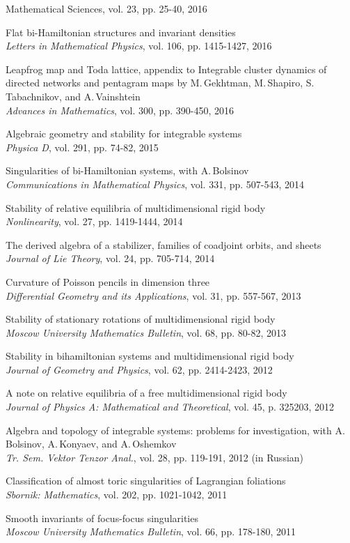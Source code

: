 \documentclass[a4paper, 12pt]{article}
\begin{document}
\begin{compactenum}
{Mathematical Sciences}, vol. 23, pp. 25-40, 2016
\item {{Flat bi-Hamiltonian structures and invariant densities}}\\\textit{Letters in Mathematical Physics},  vol. 106, pp. 1415-1427, 2016
\item {{Leapfrog map and Toda lattice}}, appendix to {{Integrable cluster dynamics of directed networks and pentagram maps}} by M.\,Gekhtman, M.\,Shapiro, S.\,Tabachnikov,  and A.\,Vainshtein\\\textit{Advances in Mathematics}, vol. 300, pp. 390-450, 2016
\item {{Algebraic geometry and stability for integrable systems}}\\\textit{Physica D}, {vol. 291}, pp. 74-82, 2015
\item {{Singularities of bi-Hamiltonian systems}}, with A.\,Bolsinov \\
\textit{Communications in Mathematical Physics}, {vol. 331}, pp. 507-543, 2014
\item {{Stability of relative equilibria of multidimensional rigid body}}\\\textit{Nonlinearity}, vol. 27, pp. 1419-1444, 2014
\item {{The derived algebra of a stabilizer, families of coadjoint orbits, and sheets}}\\\textit{Journal of Lie Theory}, {vol. 24}, pp. 705-714, 2014
\item {{Curvature of Poisson pencils in dimension three}}\\\textit{Differential Geometry and its Applications}, {vol. 31}, pp. 557-567, 2013
\item {{Stability of stationary rotations of multidimensional rigid body}}\\\textit{Moscow University Mathematics Bulletin}, {vol. 68}, pp. 80-82, 2013
\item {{Stability in bihamiltonian systems and
multidimensional rigid body}}\\\textit{Journal of Geometry and Physics}, {vol. 62}, pp. 2414-2423, 2012
\item {{A note on relative equilibria of a free
multidimensional rigid body}}\\\textit{Journal of Physics A: Mathematical and Theoretical}, {vol. 45}, p. 325203, 2012
\item {Algebra and topology of integrable systems: problems for investigation}, with A.\,Bolsinov, A.\,Konyaev, and A.\,Oshemkov\\\textit{Tr. Sem. Vektor Tenzor Anal.}, {vol. 28}, pp. 119-191, 2012 (in Russian)
\item {{Classification of almost toric singularities of Lagrangian foliations}}\\\textit{Sbornik: Mathematics}, {vol. 202}, pp. 1021-1042, 2011
\item {{Smooth invariants of focus-focus singularities}} \\
\textit{Moscow University Mathematics Bulletin}, {vol. 66}, pp. 178-180, 2011
\end{compactenum}
\end{document}
